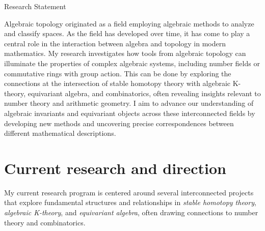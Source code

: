 \documentclass[11pt]{article}
\begin{document}
\begin{center}\LARGE{Research Statement}
\end{center}

Algebraic topology originated as a field employing algebraic methods to analyze and classify spaces.  As the field has developed over time, it has come to play a central role in the interaction between algebra and topology in modern mathematics.
My research investigates how tools from algebraic topology can illuminate the properties of complex algebraic systems, including number fields or commutative rings with group action.
This can be done by exploring the connections at the intersection of stable homotopy theory with algebraic K-theory, equivariant algebra, and combinatorics, often revealing insights relevant to number theory and arithmetic geometry.
I aim to advance our understanding of algebraic invariants and equivariant objects across these interconnected fields by developing new methods and uncovering precise correspondences between different mathematical descriptions.

\section{Current research and direction}

My current research program is centered around several interconnected projects that explore fundamental structures and relationships in {\it stable homotopy theory}, {\it algebraic K-theory}, and {\it equivariant algebra}, often drawing connections to number theory and combinatorics.
\end{document}
